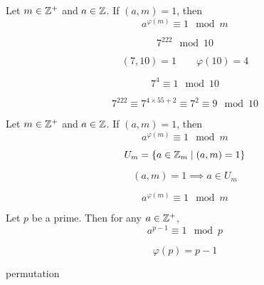 \begin{frame}
  \begin{theorem}
    Let $m \in \mathbb{Z}^{+}$ and $a \in \mathbb{Z}$.
    If $(a, m) = 1$, then
    \[
      a^{\varphi(m)} \equiv 1 \mod{m}
    \]
  \end{theorem}

  \pause
  \[
    7^{222} \mod{10}
  \]

  \pause
  \[
    (7, 10) = 1 \qquad \varphi(10) = 4
  \]

  \pause
  \[
    7^{4} \equiv 1 \mod{10}
  \]

  \pause
  \[
    7^{222} \equiv 7^{4 \times 55 + 2} \equiv 7^{2} \equiv 9 \mod{10}
  \]
\end{frame}

\begin{frame}
  \begin{theorem}
    Let $m \in \mathbb{Z}^{+}$ and $a \in \mathbb{Z}$.
    If $(a, m) = 1$, then
    \[
      a^{\varphi(m)} \equiv 1 \mod{m}
    \]
  \end{theorem}

  \pause
  \vspace{0.30cm}
  \[
    U_{m} = \{a \in \mathbb{Z}_{m} \mid (a, m) = 1\}
  \]

  \pause
  \[
    (a, m) = 1 \implies a \in U_{m}
  \]

  \pause
  \[
    a^{\varphi(m)} \equiv 1 \mod{m}
  \]
\end{frame}

\begin{frame}
  \begin{theorem}
    Let $p$ be a prime. Then for any $a \in \mathbb{Z}^{+}$,
    \[
      a^{p-1} \equiv 1 \mod{p}
    \]
  \end{theorem}

  \pause
  \[
    \varphi(p) = p - 1
  \]
\end{frame}

\begin{frame}
  permutation
\end{frame}
